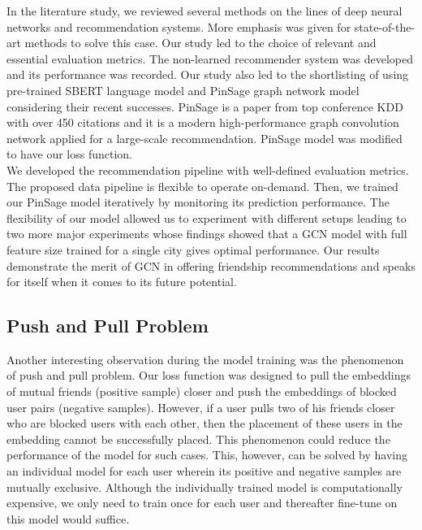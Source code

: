 \documentclass{kththesis}
\begin{document}
In the literature study, we reviewed several methods on the lines of deep neural networks and recommendation systems. More emphasis was given for state-of-the-art methods to solve this case. Our study led to the choice of relevant and essential evaluation metrics. The non-learned recommender system was developed and its performance was recorded. Our study also led to the shortlisting of using pre-trained SBERT language model and PinSage graph network model considering their recent successes. PinSage is a paper from top conference KDD with over 450 citations and it is a modern high-performance graph convolution network applied for a large-scale recommendation. PinSage model was modified to have our loss function. \\

We developed the recommendation pipeline with well-defined evaluation metrics. The proposed data pipeline is flexible to operate on-demand. Then, we trained our PinSage model iteratively by monitoring its prediction performance. The flexibility of our model allowed us to experiment with different setups leading to two more major experiments whose findings showed that a GCN model with full feature size trained for a single city gives optimal performance. Our results demonstrate the merit of GCN in offering friendship recommendations and speaks for itself when it comes to its future potential.

\subsection{Push and Pull Problem}
Another interesting observation during the model training was the phenomenon of push and pull problem. Our loss function was designed to pull the embeddings of mutual friends (positive sample) closer and push the embeddings of blocked user pairs (negative samples). However, if a user pulls two of his friends closer who are blocked users with each other, then the placement of these users in the embedding cannot be successfully placed. This phenomenon could reduce the performance of the model for such cases. This, however, can be solved by having an individual model for each user wherein its positive and negative samples are mutually exclusive. Although the individually trained model is computationally expensive, we only need to train once for each user and thereafter fine-tune on this model would suffice.
\end{document}
